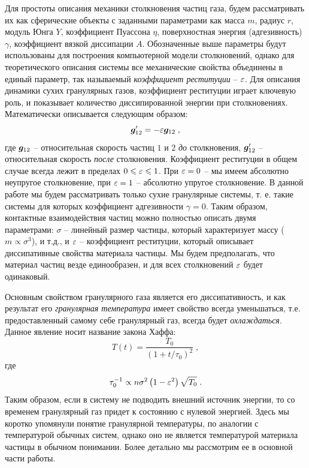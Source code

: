 Для простоты описания механики столкновения частиц газа, будем рассматривать их как сферические объекты с заданными параметрами как
масса $m$, радиус $r$, модуль Юнга $Y$, коэффициент Пуассона $\eta$, поверхностная энергия (адгезивность) $\gamma$, коэффициент вязкой диссипации $A$.
Обозначенные выше параметры будут использованы для построения компьютерной модели столкновений, однако для теоретического описания системы
все механические свойства объединены в единый параметр, так называемый \emph{коэффициент реституции} -- $\varepsilon$. Для описания динамики сухих
гранулярных газов, коэффициент реституции играет ключевую роль, и показывает количество диссипированной энергии при столкновениях. Математически
описывается следующим образом:
\begin{equation}\label{eq:restitution}
    \bm{g}'_{12} = -\varepsilon\bm{g}_{12}\;,
\end{equation}
где $\bm{g}_{12}$ -- относительная скорость частиц $1$ и $2$ \emph{до} столкновения, $\bm{g}'_{12}$ -- относительная скорость \emph{после} столкновения.
Коэффициент реституции в общем случае всегда лежит в пределах $0\leqslant\varepsilon\leqslant 1$. При $\varepsilon = 0$ -- мы имеем абсолютно неупругое столкновение, 
при $\varepsilon = 1$ -- абсолютно упругое столкновение. В данной работе мы будем рассматривать только сухие гранулярные системы, т. е. такие
системы для которых коэффициент адгезивности $\gamma = 0$. Таким образом, контактные взаимодействия частиц можно полностью описать двумя параметрами:
$\sigma$ -- линейный размер частицы, который характеризует массу ($m\propto \sigma^3$), и т.д., 
и $\varepsilon$ -- коэффициент реституции, который описывает диссипативные свойства материала частицы. Мы будем предполагать, что материал частиц 
везде единообразен, и для всех столкновений $\varepsilon$ будет одинаковый. 

Основным свойством гранулярного газа является его диссипативность, и как результат его \emph{гранулярная температура} имеет свойство всегда уменьшаться, 
т.е. предоставленный самому себе гранулярный газ, всегда будет \emph{охлаждаться}. Данное явление носит название закона Хаффа:
\begin{equation}
    T(t) = \frac{T_0}{(1+t/\tau_0)^2}\;, 
\end{equation}
где
\begin{equation}
    \tau^{-1}_0\propto n\sigma^2\left(1-\varepsilon^2\right)\sqrt{T_0}\;.
\end{equation}
Таким образом, если в систему не подводить внешний источник энергии, то со временем гранулярный газ придет к состоянию с нулевой энергией. Здесь мы
коротко упомянули понятие гранулярной температуры, по аналогии с температурой обычных систем, однако оно не является температурой материала частицы 
в обычном понимании. Более детально мы рассмотрим ее в основной части работы.

